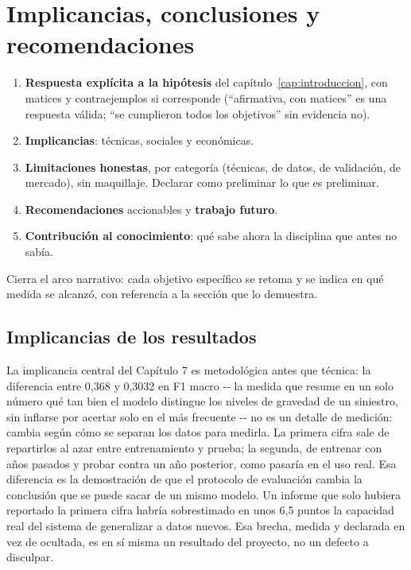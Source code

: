 
\chapter{Implicancias, conclusiones y recomendaciones}\label{cap:conclusiones}

\begin{guia}
\begin{enumerate}
    \item \textbf{Respuesta explícita a la hipótesis} del
          capítulo~\ref{cap:introduccion}, con matices y contraejemplos
          si corresponde (``afirmativa, con matices'' es una respuesta
          válida; ``se cumplieron todos los objetivos'' sin evidencia no).
    \item \textbf{Implicancias}: técnicas, sociales y económicas.
    \item \textbf{Limitaciones honestas}, por categoría (técnicas, de datos,
          de validación, de mercado), sin maquillaje. Declarar como
          preliminar lo que es preliminar.
    \item \textbf{Recomendaciones} accionables y \textbf{trabajo futuro}.
    \item \textbf{Contribución al conocimiento}: qué sabe ahora la disciplina
          que antes no sabía.
\end{enumerate}
Cierra el arco narrativo: cada objetivo específico se retoma y se
indica en qué medida se alcanzó, con referencia a la sección que lo
demuestra.
\end{guia}

\section{Implicancias de los resultados}

La implicancia central del Capítulo 7 es metodológica antes que técnica:
la diferencia entre 0,368 y 0,3032 en F1 macro -\/- la medida que resume
en un solo número qué tan bien el modelo distingue los niveles de
gravedad de un siniestro, sin inflarse por acertar solo en el más
frecuente -\/- no es un detalle de medición: cambia según cómo se
separan los datos para medirla. La primera cifra sale de repartirlos al
azar entre entrenamiento y prueba; la segunda, de entrenar con años
pasados y probar contra un año posterior, como pasaría en el uso real.
Esa diferencia es la demostración de que el protocolo de evaluación
cambia la conclusión que se puede sacar de un mismo modelo. Un informe
que solo hubiera reportado la primera cifra habría sobrestimado en unos
6,5 puntos la capacidad real del sistema de generalizar a datos nuevos.
Esa brecha, medida y declarada en vez de ocultada, es en sí misma un
resultado del proyecto, no un defecto a disculpar.

